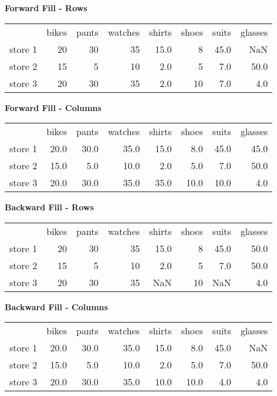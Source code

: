 \documentclass{article}
\begin{document}
\textbf{Forward Fill - Rows}
\begin{center}
	\begin{tabular}{lrrrrrrr}
		{} &  bikes &  pants &  watches &  shirts &  shoes &  suits &  glasses \\
		store 1 &     20 &     30 &       35 &    15.0 &      8 &   45.0 &      NaN \\
		store 2 &     15 &      5 &       10 &     2.0 &      5 &    7.0 &     50.0 \\
		store 3 &     20 &     30 &       35 &     2.0 &     10 &    7.0 &      4.0 \\
	\end{tabular}
\end{center}

\textbf{Forward Fill - Columns}
\begin{center}
	\begin{tabular}{lrrrrrrr}
		{} &  bikes &  pants &  watches &  shirts &  shoes &  suits &  glasses \\
		store 1 &   20.0 &   30.0 &     35.0 &    15.0 &    8.0 &   45.0 &     45.0 \\
		store 2 &   15.0 &    5.0 &     10.0 &     2.0 &    5.0 &    7.0 &     50.0 \\
		store 3 &   20.0 &   30.0 &     35.0 &    35.0 &   10.0 &   10.0 &      4.0 \\
	\end{tabular}
\end{center}

\textbf{Backward Fill - Rows}
\begin{center}
	\begin{tabular}{lrrrrrrr}
		{} &  bikes &  pants &  watches &  shirts &  shoes &  suits &  glasses \\
		store 1 &     20 &     30 &       35 &    15.0 &      8 &   45.0 &     50.0 \\
		store 2 &     15 &      5 &       10 &     2.0 &      5 &    7.0 &     50.0 \\
		store 3 &     20 &     30 &       35 &     NaN &     10 &    NaN &      4.0 \\
	\end{tabular}
\end{center}

\textbf{Backward Fill - Columns}
\begin{center}
	\begin{tabular}{lrrrrrrr}
		{} &  bikes &  pants &  watches &  shirts &  shoes &  suits &  glasses \\
		store 1 &   20.0 &   30.0 &     35.0 &    15.0 &    8.0 &   45.0 &      NaN \\
		store 2 &   15.0 &    5.0 &     10.0 &     2.0 &    5.0 &    7.0 &     50.0 \\
		store 3 &   20.0 &   30.0 &     35.0 &    10.0 &   10.0 &    4.0 &      4.0 \\
	\end{tabular}
\end{center}
\end{document}
